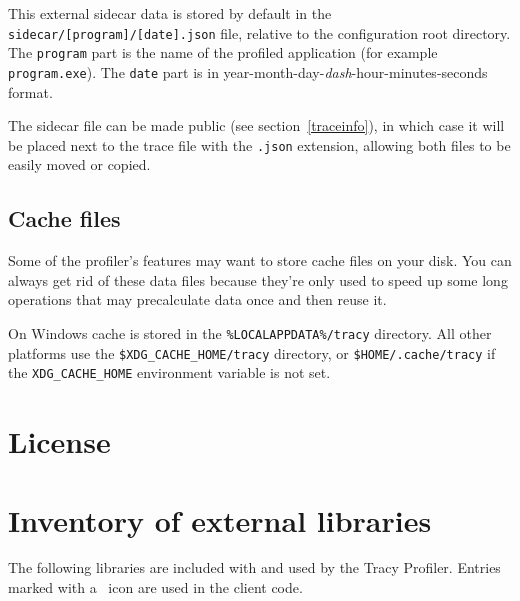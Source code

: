 \documentclass[hidelinks,titlepage,a4paper,twoside]{article}
\begin{document}
This external sidecar data is stored by default in the \texttt{sidecar/[program]/[date].json} file, relative to the configuration root directory. The \texttt{program} part is the name of the profiled application (for example \texttt{program.exe}). The \texttt{date} part is in year-month-day-\emph{dash}-hour-minutes-seconds format.

The sidecar file can be made public (see section~\ref{traceinfo}), in which case it will be placed next to the trace file with the \texttt{.json} extension, allowing both files to be easily moved or copied.

\subsection{Cache files}

Some of the profiler's features may want to store cache files on your disk. You can always get rid of these data files because they're only used to speed up some long operations that may precalculate data once and then reuse it.

On Windows cache is stored in the \texttt{\%LOCALAPPDATA\%/tracy} directory. All other platforms use the \texttt{\$XDG\_CACHE\_HOME/tracy} directory, or \texttt{\$HOME/.cache/tracy} if the \texttt{XDG\_CACHE\_HOME} environment variable is not set.

\newpage
\appendix
\appendixpage

\section{License}



\section{Inventory of external libraries}

The following libraries are included with and used by the Tracy Profiler. Entries marked with a \faStar{}~icon are used in the client code.
\end{document}
